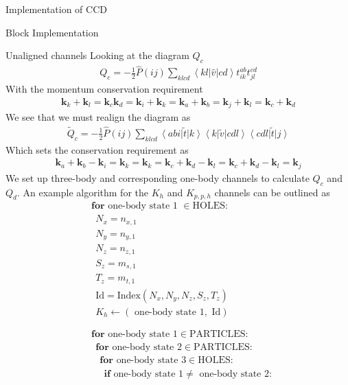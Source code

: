 \documentclass[twoside,english]{uiofysmaster}
\begin{document}
\begin{chapter}{Implementation of CCD}
\begin{section}{Block Implementation}
\begin{subsection}{Unaligned channels}
			Looking at the diagram $Q_c$
			\begin{align}
				Q_c = -\frac{1}{2} \hat P(ij) \sum_{klcd} \left<kl|\hat v|cd\right> t_{ik}^{ab} t_{jl}^{cd}
			\end{align}
			With the momentum conservation requirement
			\begin{align}
				\mathbf{k}_k + \mathbf{k}_l = \mathbf{k}_c \mathbf{k}_d = \mathbf{k}_i + \mathbf{k}_k = \mathbf{k}_a + \mathbf{k}_b = \mathbf{k}_j + \mathbf{k}_l = \mathbf{k}_c + \mathbf{k}_d
			\end{align}
			We see that we must realign the diagram as
			\begin{align}
				\tilde Q_c = -\frac{1}{2} \hat P(ij) \sum_{klcd} \left<abi\right|\tilde t\left|k\right> \left<k\right|\tilde v\left|cdl\right> \left<cdl\right|\tilde t\left|j\right>
			\end{align}
			Which sets the conservation requirement as 
			\begin{align}
				\mathbf{k}_a + \mathbf{k}_b	- \mathbf{k}_i = \mathbf{k}_k = \mathbf{k}_k = \mathbf{k}_c + \mathbf{k}_d - \mathbf{k}_l = \mathbf{k}_c + \mathbf{k}_d - \mathbf{k}_l = \mathbf{k}_j
			\end{align}
			We set up three-body and corresponding one-body channels to calculate $Q_c$ and $Q_d$. An example algorithm for the $K_h$ and $K_{p,p,h}$ channels can be outlined as
			\begin{align*}
				&\mathbf{for } \text{ one-body state 1 } \in \text{HOLES}:\\
				&\:\: N_x = n_{x,1}\\
				&\:\: N_y = n_{y,1}\\
				&\:\: N_z = n_{z,1}\\
 				&\:\: S_z = m_{s,1}\\
				&\:\: T_z = m_{t,1}\\
				&\:\: \text{Id} = \text{Index}(N_x,N_y,N_z,S_z,T_z) \\
				&\:\: K_h \leftarrow (\text{ one-body state 1}, \text{ Id}) \\ \\ \\ 
				&\mathbf{for } \text{ one-body state 1} \in \text{PARTICLES}: \\
				&\:\: \mathbf{for } \text{ one-body state 2} \in \text{PARTICLES}: \\
				&\:\:\:\: \mathbf{for } \text{ one-body state 3} \in \text{HOLES}: \\
				&\:\:\:\:\:\: \mathbf{if} \text{ one-body state 1} \neq \text{ one-body state 2}: \\

\end{align*}
\end{subsection}
\end{section}
\end{chapter}
\end{document}
